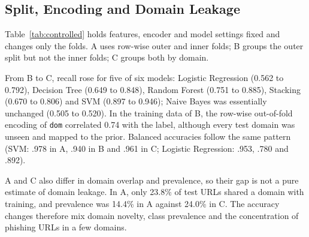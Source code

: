 \documentclass[conference]{IEEEtran}
\begin{document}
\begin{table}[htbp]
\centering
\caption{Mean $\pm$ SD over Five Repeated Domain-Grouped Splits}
\label{tab:repeated}
\small
{}
\end{table}

\subsection{Split, Encoding and Domain Leakage}
\label{sec:comparison}
Table~\ref{tab:controlled} holds features, encoder and model settings fixed and changes only the folds. A uses row-wise outer and inner folds; B groups the outer split but not the inner folds; C groups both by domain.

From B to C, recall rose for five of six models: Logistic Regression (0.562 to 0.792), Decision Tree (0.649 to 0.848), Random Forest (0.751 to 0.885), Stacking (0.670 to 0.806) and SVM (0.897 to 0.946); Naive Bayes was essentially unchanged (0.505 to 0.520). In the training data of B, the row-wise out-of-fold encoding of \texttt{dom} correlated 0.74 with the label, although every test domain was unseen and mapped to the prior. Balanced accuracies follow the same pattern (SVM: .978 in A, .940 in B and .961 in C; Logistic Regression: .953, .780 and .892).

A and C also differ in domain overlap and prevalence, so their gap is not a pure estimate of domain leakage. In A, only 23.8\% of test URLs shared a domain with training, and prevalence was 14.4\% in A against 24.0\% in C. The accuracy changes therefore mix domain novelty, class prevalence and the concentration of phishing URLs in a few domains.
\end{document}
